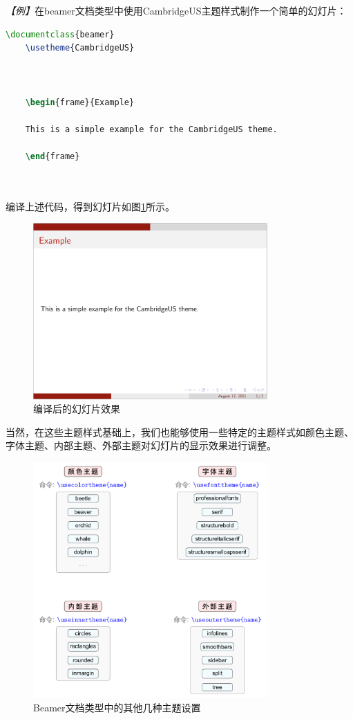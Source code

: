 \emph{【例】}在beamer文档类型中使用CambridgeUS主题样式制作一个简单的幻灯片：
\begin{lstlisting}[language=TeX]
    \documentclass{beamer}
    \usetheme{CambridgeUS}
    
    
    
    \begin{frame}{Example}
    
    This is a simple example for the CambridgeUS theme.
    
    \end{frame}
    
    
\end{lstlisting}

编译上述代码，得到幻灯片如图\ref{figeg:002}所示。

\begin{figure}[htbp]
    \centering
    \includegraphics[width = 0.8\textwidth]{images/ch_9/example_sec2_1.png}
    \caption{编译后的幻灯片效果}
    \label{figeg:002}
\end{figure}

当然，在这些主题样式基础上，我们也能够使用一些特定的主题样式如颜色主题、字体主题、内部主题、外部主题对幻灯片的显示效果进行调整。

\begin{figure}[htbp]
    \centering
    \includegraphics[width = 0.8\textwidth]{images/ch_9/other_themes.pdf}
    \caption{Beamer文档类型中的其他几种主题设置}
    \label{figeg:003}
\end{figure}

